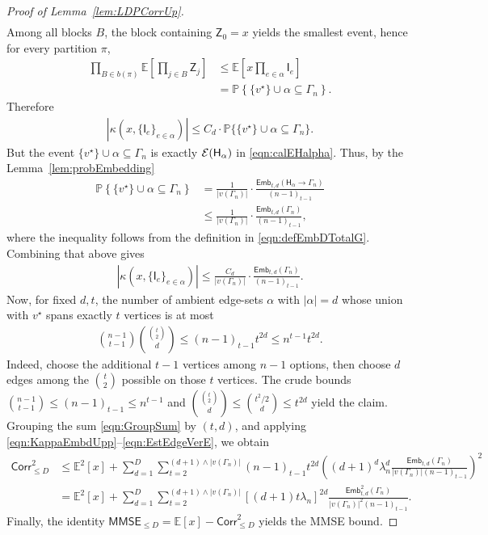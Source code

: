 \documentclass[12pt]{article}
\newcommand{\bE}{\mathbb{E}}
\newcommand{\calE}{{\cal E}}
\newcommand{\pp}[1]{\left[#1\right]}
\newcommand{\ppp}[1]{\left\{#1\right\}}
\newcommand{\s}[1]{\mathsf{#1}}
\begin{document}
\begin{proof}[Proof of Lemma~\ref{lem:LDPCorrUp}]
\begin{align}
\end{align}
Among all blocks $B$, the block containing $\s{Z}_0=x$ yields the smallest event, hence for every partition $\pi$,
\begin{align}
\prod_{B\in b(\pi)}\mathbb{E}\pp{\prod_{j\in B}\s{Z}_j}&\leq\mathbb{E}\pp{x\prod_{e\in\alpha}\s{I}_e}\\
&=\mathbb{P}\ppp{\{v^\star\}\cup\alpha\subseteq \Gamma_n}.
\end{align}
Therefore
\begin{align}
|\kappa(x,\{\s{I}_e\}_{e\in\alpha})|\leq C_d\cdot\mathbb{P}\{\{v^\star\}\cup\alpha\subseteq \Gamma_n\}.
\end{align}
But the event $\{v^\star\}\cup\alpha\subseteq \Gamma_n$ is exactly $\calE(\s{H}_\alpha)$ in \eqref{eqn:calEHalpha}. Thus, by the Lemma~\ref{lem:probEmbedding}
\begin{align}
\mathbb{P}\ppp{\{v^\star\}\cup\alpha\subseteq \Gamma_n}&=\frac{1}{|v(\Gamma_n)|}\cdot \frac{\s{Emb}_{t,d}(\s{H}_\alpha\to\Gamma_n)}{(n-1)_{t-1}}\\
&\leq \frac{1}{|v(\Gamma_n)|}\cdot \frac{\s{Emb}_{t,d}(\Gamma_n)}{(n-1)_{t-1}},
\end{align}
where the inequality follows from the definition in \eqref{eqn:defEmbDTotalG}. Combining that above gives
\begin{align}
|\kappa(x,\{\s{I}_e\}_{e\in\alpha})|\leq \frac{C_d}{|v(\Gamma_n)|}\cdot \frac{\s{Emb}_{t,d}(\Gamma_n)}{(n-1)_{t-1}}.\label{eqn:KappaEmbdUpp}
\end{align}
Now, for fixed $d,t$, the number of ambient edge-sets $\alpha$ with $|\alpha|=d$ whose union with $v^\star$ spans exactly $t$ vertices is at most
\begin{align}
\binom{n-1}{t-1}\binom{\binom{t}{2}}{d}\leq (n-1)_{t-1}t^{2d}
\leq n^{t-1}t^{2d}.\label{eqn:EstEdgeVerE}
\end{align}
Indeed, choose the additional $t-1$ vertices among $n-1$ options, then choose $d$ edges among the $\binom{t}{2}$ possible on those $t$ vertices. The crude bounds $\binom{n-1}{t-1}\leq (n-1)_{t-1}\leq n^{t-1}$ and $\binom{\binom{t}{2}}{d}\leq \binom{t^2/2}{d}\leq t^{2d}$ yield the claim. Grouping the sum \eqref{eqn:GroupSum} by $(t,d)$, and applying \eqref{eqn:KappaEmbdUpp}--\eqref{eqn:EstEdgeVerE}, we obtain
\begin{align}
\s{Corr}^2_{\le D}
&\leq\bE^2[x]+\sum_{d=1}^D\sum_{t=2}^{(d+1)\wedge |v(\Gamma_n)|}  (n-1)_{t-1}t^{2d}\left((d+1)^d\lambda_n^d\frac{\s{Emb}_{t,d}(\Gamma_n)}{|v(\Gamma_n)|(n-1)_{t-1}}\right)^2\\
& =\bE^2[x]+\sum_{d=1}^D\sum_{t=2}^{(d+1)\wedge |v(\Gamma_n)|}[(d+1)t\lambda_n]^{2d}\frac{\s{Emb}^2_{t,d}(\Gamma_n)}{|v(\Gamma_n)|^2(n-1)_{t-1}}.
\end{align}
Finally, the identity $\s{MMSE}_{\le D}=\mathbb{E}[x]-\s{Corr}_{\le D}^2$ yields the MMSE bound.
\end{proof}
\end{document}
